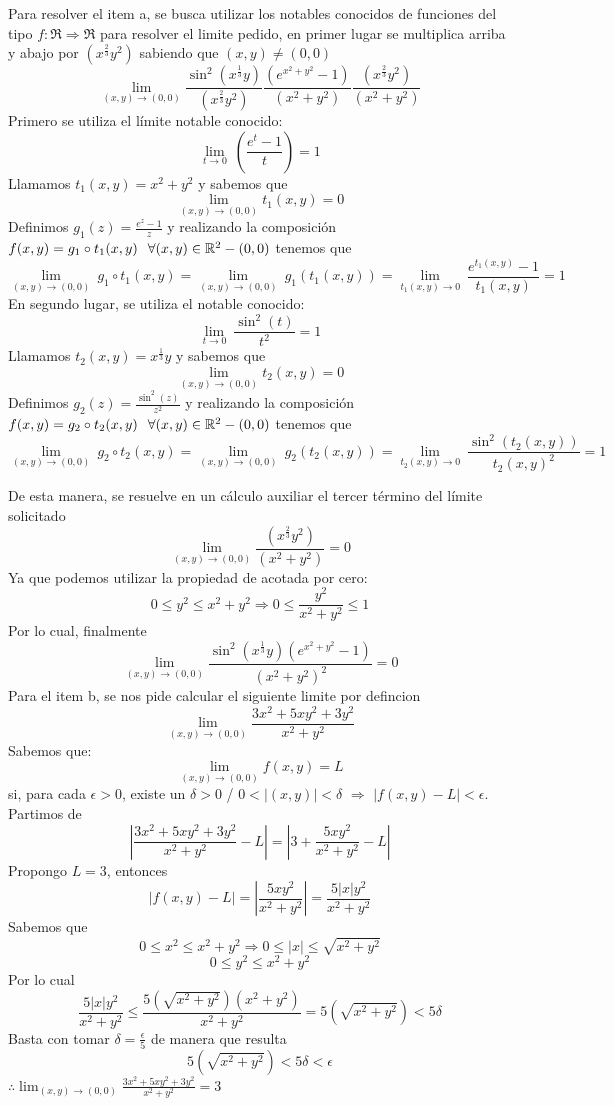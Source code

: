 \begin{solution}
    Para resolver el item a, se busca utilizar los notables conocidos de funciones del tipo $f:\Re\Rightarrow\Re$ para resolver el limite pedido, en primer lugar se multiplica arriba y abajo por $(x^{\frac{2}{3}}y^2)$ sabiendo que $(x,y)\neq(0,0)$
    \[
        \lim_{(x,y)\to(0,0)} \frac{\sin^2{(x^{\frac{1}{3}}y)}}{(x^{\frac{2}{3}}y^2)}\frac{(e^{x^2+y^2}-1)}{(x^2+y^2)}\frac{(x^{\frac{2}{3}}y^2)}{(x^2+y^2)}
    \]
Primero se utiliza el límite notable conocido:    
\[
        \lim_{t\to 0} \
        (\frac{e^{t}-1}{t})=1
    \]
    Llamamos  $t_1(x,y)=x^{2}+y^{2}$ y sabemos que 
   \[
        \lim_{(x,y)\to(0,0)} t_1(x,y)=0
    \]
    Definimos $g_1(z)=\frac{e^{z}-1}{z} $ y realizando la composición $f(x,y)=g_1\circ t_1(x,y) \hspace{0.25cm}\forall (x,y)\in \mathbb{R}^ 2 -(0,0)$ tenemos que
\[
        \lim_{(x,y)\to (0,0)} \
        g_1\circ t_1(x,y)=\lim_{(x,y)\to (0,0)} \
        g_1(t_1(x,y))=\lim_{t_1(x,y)\to 0} \
        \frac{e^{t_1(x,y)}-1}{t_1(x,y)}=1
    \]
En segundo lugar, se utiliza el notable conocido: 
\[
        \lim_{t\to 0} \
        \frac{\sin^2{(t)}}{t^2}=1
 \]
  Llamamos  $t_2(x,y)=x^{\frac{1}{3}}y$ y sabemos que 
   \[
        \lim_{(x,y)\to(0,0)} t_2(x,y)=0
    \]
    Definimos $g_2(z)=\frac{\sin^2{(z)}}{z^2} $ y realizando la composición $f(x,y)=g_2\circ t_2(x,y) \hspace{0.25cm}\forall (x,y)\in \mathbb{R}^ 2 -(0,0)$ tenemos que
\[
        \lim_{(x,y)\to (0,0)} \
        g_2\circ t_2(x,y)=\lim_{(x,y)\to (0,0)} \
        g_2(t_2(x,y))=\lim_{t_2(x,y)\to 0} \
        \frac{\sin^2{(t_2(x,y))}}{t_2(x,y)^2}=1
    \]

    De esta manera, se resuelve en un cálculo auxiliar el tercer término del límite solicitado
\[
        \lim_{(x,y)\to(0,0)} \frac{(x^{\frac{2}{3}}y^2)}{(x^2+y^2)}=0
    \]
Ya que podemos utilizar la propiedad de acotada por cero:
\[
        0\le y^2\le x^2+y^2    \Rightarrow   0\le \frac{y^2}{x^2+y^2}\le 1
    \]
Por lo cual, finalmente
\[
        \lim_{(x,y)\to(0,0)} \frac{\sin^2{(x^{\frac{1}{3}}y)}(e^{x^2+y^2}-1)}{(x^2+y^2)^2}=0
    \]
\newpage
Para el item b, se nos pide calcular el siguiente limite por defincion
\[
        \lim_{(x,y)\to(0,0)} \frac{3x^2+5xy^2+3y^2}{x^2+y^2}
    \]
Sabemos que:
\[
\lim_{(x,y) \to (0,0)} f(x,y) = L
\]
si, para cada \( \epsilon > 0 \), existe un \( \delta > 0 \) / \( 0 < |(x,y)| < \delta \) $\Rightarrow$ \( |f(x,y) - L| < \epsilon \).
Partimos de 
\[
|\frac{3x^2+5xy^2+3y^2}{x^2+y^2}-L|=|3+\frac{5xy^2}{x^2+y^2}-L|
\]
Propongo $L=3$, entonces
\[
|f(x,y) - L|=|\frac{5xy^2}{x^2+y^2}|=\frac{5|x|y^2}{x^2+y^2}
\]
Sabemos que 
\[
0\le x^2\le x^2+y^2 \Rightarrow 0\le |x|\le \sqrt{x^2+y^2 }
\]
\[
0\le y^2\le x^2+y^2
\]
Por lo cual
\[
\frac{5|x|y^2}{x^2+y^2} \le \frac{5(\sqrt{x^2+y^2})(x^2+y^2)}{x^2+y^2}=5(\sqrt{x^2+y^2})<5\delta
\]
Basta con tomar $\delta=\frac{\epsilon}{5}$ de manera que resulta
\[
5(\sqrt{x^2+y^2})<5\delta<\epsilon
\]
$\therefore  \lim_{(x,y)\to(0,0)} \frac{3x^2+5xy^2+3y^2}{x^2+y^2}=3$ 
\end{solution}
\newpage


